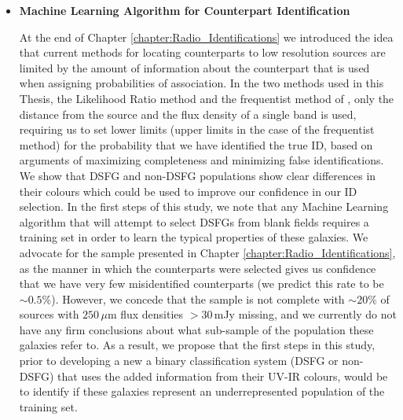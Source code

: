 \begin{itemize}
\item \textbf{Machine Learning Algorithm for Counterpart Identification}

At the end of Chapter \ref{chapter:Radio_Identifications} we introduced the idea that current methods for locating counterparts to low resolution sources are limited by the amount of information about the counterpart that is used when assigning probabilities of association. In the two methods used in this Thesis, the Likelihood Ratio method and the frequentist method of \citealt{Lilly_1999}, only the distance from the source and the flux density of a single band is used, requiring us to set lower limits (upper limits in the case of the frequentist method) for the probability that we have identified the true ID, based on arguments of maximizing completeness and minimizing false identifications. We show that DSFG and non-DSFG populations show clear differences in their colours which could be used to improve our confidence in our ID selection. In the first steps of this study, we note that any Machine Learning algorithm that will attempt to select DSFGs from blank fields requires a training set in order to learn the typical properties of these galaxies. We advocate for the sample presented in Chapter \ref{chapter:Radio_Identifications}, as the manner in which the counterparts were selected gives us confidence that we have very few misidentified counterparts (we predict this rate to be $\sim0.5\%$). However, we concede that the sample is not complete with $\sim20\%$ of sources with $250\,\mu$m flux densities $>30\,$mJy missing, and we currently do not have any firm conclusions about what sub-sample of the population these galaxies refer to. As a result, we propose that the first steps in this study, prior to developing a new a binary classification system (DSFG or non-DSFG) that uses the added information from their UV-IR colours, would be to identify if these galaxies represent an underrepresented population of the training set. 


\end{itemize}

